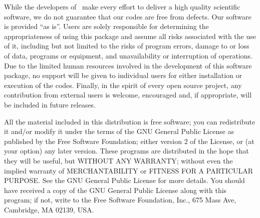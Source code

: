  While the developers of \WANT\ make
every effort to deliver a high quality scientific software, we do
not guarantee that our codes are free from defects. Our software
is provided ``as is''. Users are solely responsible for determining
the appropriateness of using this package and assume all risks
associated with the use of it, including but not limited to the
risks of program errors, damage to or loss of data, programs or
equipment, and unavailability or interruption of operations. Due
to the limited human resources involved in the development of this
software package, no support will be given to individual users for
either installation or execution of the codes. Finally, in the
spirit of every open source project, any contribution from
external users is welcome, encouraged and, if appropriate, will be
included in future releases.\\
  \vspace{0.25in}

 All the material included in this
distribution is free software; you can redistribute it and/or
modify it under the terms of the GNU General Public License as
published by the Free Software Foundation; either version 2 of the
License, or (at your option) any later version. These programs are
distributed in the hope that they will be useful, but WITHOUT ANY
WARRANTY; without even the implied warranty of MERCHANTABILITY or
FITNESS FOR A PARTICULAR PURPOSE. See the GNU General Public
License for more details. You should have received a copy of the
GNU General Public License along with this program; if not, write
to the Free Software Foundation, Inc., 675 Mass Ave, Cambridge, MA
02139, USA.
